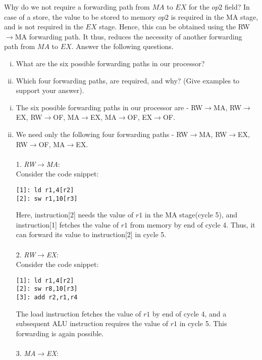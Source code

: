 \begin{ExerciseList}
\Exercise 
Why do we not require a forwarding path from $MA$ to $EX$ for the $op2$ field?
\Answer
In case of a store, the value to be stored to memory $op2$ is required in the MA stage, and is not required in the $EX$ stage. Hence, this can be obtained using the RW$\rightarrow$MA forwarding path. It thus, reduces the necessity of another forwarding path from $MA$ to $EX$. 
\Exercise Answer the following questions.
\begin{enumerate}[i) ]
\item What are the six possible forwarding paths in our \simplerisc processor? 
\item Which four forwarding paths, are required, and why? (Give examples to support your answer). 
\end{enumerate}
\Answer
\begin{enumerate}[i) ]
\item The six possible forwarding paths in our \simplerisc processor are - RW$\rightarrow$MA, RW$\rightarrow$EX, RW$\rightarrow$OF, MA$\rightarrow$EX, MA$\rightarrow$OF, EX$\rightarrow$OF. \\      
\item We need only the following four forwarding paths - RW$\rightarrow$MA, RW$\rightarrow$EX, RW$\rightarrow$OF, MA$\rightarrow$EX. \\ \\ 
1. \textit{RW$\rightarrow$MA}: \\
  Consider the code snippet: \\
\begin{Verbatim}
[1]: ld r1,4[r2]
[2]: sw r1,10[r3]
\end{Verbatim}
Here, instruction[2] needs the value of $r1$ in the MA stage(cycle 5), and instruction[1] fetches the value of $r1$ from memory by end of cycle 4. Thus, it can forward its value to instruction[2] in cycle 5. \\ \\
2. \textit{RW$\rightarrow$EX}: \\
  Consider the code snippet: \\
\begin{Verbatim}
[1]: ld r1,4[r2]
[2]: sw r8,10[r3]
[3]: add r2,r1,r4
\end{Verbatim}
The load instruction fetches the value of $r1$ by end of cycle 4, and a subsequent ALU instruction requires the value of $r1$ in cycle 5. This forwarding is again possible. \\ \\
3. \textit{MA$\rightarrow$EX}: \\

\end{enumerate}
\end{ExerciseList}
